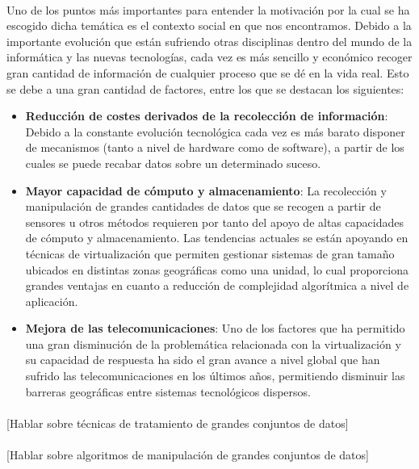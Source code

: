 \documentclass{subfiles}
\begin{document}
    \paragraph{}
    Uno de los puntos más importantes para entender la motivación por la cual se ha escogido dicha temática es el contexto social en que nos encontramos. Debido a la importante evolución que están sufriendo otras disciplinas dentro del mundo de la informática y las nuevas tecnologías, cada vez es más sencillo y económico recoger gran cantidad de información de cualquier proceso que se dé en la vida real. Esto se debe a una gran cantidad de factores, entre los que se destacan los siguientes:

    \begin{itemize}

      \item \textbf{Reducción de costes derivados de la recolección de información}: Debido a la constante evolución tecnológica cada vez es más barato disponer de mecanismos (tanto a nivel de hardware como de software), a partir de los cuales se puede recabar datos sobre un determinado suceso.

      \item \textbf{Mayor capacidad de cómputo y almacenamiento}: La recolección y manipulación de grandes cantidades de datos que se recogen a partir de sensores u otros métodos requieren por tanto del apoyo de altas capacidades de cómputo y almacenamiento. Las tendencias actuales se están apoyando en técnicas de virtualización que permiten gestionar sistemas de gran tamaño ubicados en distintas zonas geográficas como una unidad, lo cual proporciona grandes ventajas en cuanto a reducción de complejidad algorítmica a nivel de aplicación.

      \item \textbf{Mejora de las telecomunicaciones}: Uno de los factores que ha permitido una gran disminución de la problemática relacionada con la virtualización y su capacidad de respuesta ha sido el gran avance a nivel global que han sufrido las telecomunicaciones en los últimos años, permitiendo disminuir las barreras geográficas entre sistemas tecnológicos dispersos.

    \end{itemize}

  \paragraph{}
  [Hablar sobre técnicas de tratamiento de grandes conjuntos de datos]

  \paragraph{}
  [Hablar sobre algoritmos de manipulación de grandes conjuntos de datos]
\end{document}
